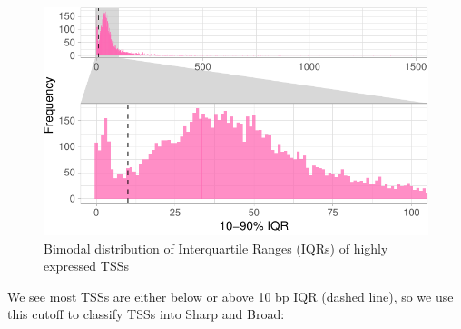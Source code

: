 \documentclass[9pt,a4paper,]{extarticle}
\newenvironment{Shaded}{\begin{snugshade}}{\end{snugshade}}
\newcommand{\KeywordTok}[1]{\textcolor[rgb]{0.13,0.29,0.53}{\textbf{{#1}}}}
\newcommand{\DataTypeTok}[1]{\textcolor[rgb]{0.13,0.29,0.53}{{#1}}}
\newcommand{\DecValTok}[1]{\textcolor[rgb]{0.00,0.00,0.81}{{#1}}}
\newcommand{\FloatTok}[1]{\textcolor[rgb]{0.00,0.00,0.81}{{#1}}}
\newcommand{\StringTok}[1]{\textcolor[rgb]{0.31,0.60,0.02}{{#1}}}
\newcommand{\NormalTok}[1]{{#1}}
\begin{document}
\begin{Shaded}
\end{Shaded}

\begin{figure}

{\centering \includegraphics{CAGEWorkflow_files/figure-latex/TSSShapes-1} 

}

\caption{Bimodal distribution of Interquartile Ranges (IQRs) of highly expressed TSSs}\label{fig:TSSShapes}
\end{figure}

We see most TSSs are either below or above 10 bp IQR (dashed line), so we use this cutoff to classify TSSs into Sharp and Broad:
\end{document}
